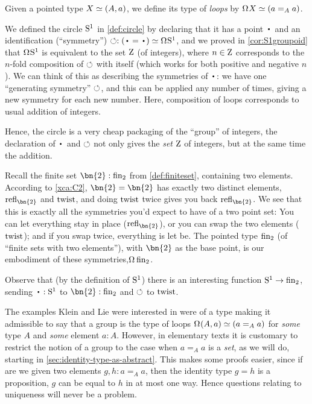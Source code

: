 \begin{definition}
  Given a pointed type $X\jdeq(A,a)$, we define its type of \emph{loops}
  by $\loops X \jdeq (a =_A a)$.
\end{definition}
\begin{example}\label{ex:base=base}
  We defined the circle ${\mathrm{S}^1}$ in \cref{def:circle} by declaring
  that it has a point $\base$ and an identification (``symmetry'')
  $\Sloop:(\base=\base) \jdeq \loops\Sc$,
  and we proved in \cref{cor:S1groupoid} that $\loops\Sc$ is equivalent
  to the set $\mathrm{Z}$ (of integers),
  where $n\in\mathrm{Z}$ corresponds to the $n$-fold composition of $\circlearrowleft$ with itself
  (which works for both positive and negative $n$).
  We can think of this as describing the symmetries of $\base$:
  we have one ``generating symmetry'' $\circlearrowleft$,
  and this can be applied any number of times,
  giving a new symmetry for each new number.
  Here, composition of loops corresponds to usual addition of integers.

Hence, the circle is a very cheap packaging of the ``{group}'' of integers, the declaration of $\base$ and $\circlearrowleft$ not only gives the \emph{set} $\mathrm{Z}$ of integers, but at the same time the addition.
\end{example}
\begin{example}
  Recall the finite set $\bn{2}:\fin_2$ from \cref{def:finiteset}, containing two elements.   
  According to \cref{xca:C2}, $\bn{2} =\bn{2} $ has exactly two distinct elements,
  $\refl{\bn{2}}$ and $\mathrm{twist}$,
  and doing $\mathrm{twist}$ twice gives you back $\refl{\bn{2}}$.
  We see that this is exactly all the symmetries
  you'd expect to have of a two point set:
  You can let everything stay in place ($\refl{\bn{2}}$),
  or you can swap the two elements ($\mathrm{twist}$);
  and if you swap twice, everything is let be.
  The pointed type $\fin_2$ (of ``finite sets with two elements''),
  with $\bn{2}$ as the base point,
  is our embodiment of these symmetries,\ie $\loops\fin_2$.

  Observe that (by the definition of ${\mathrm{S}^1}$)
  there is an interesting function $\Sc\to\fin_2$,
  sending $\base:\Sc$ to $\bn{2} :\fin_2$ and $\circlearrowleft$ to $\mathrm{twist}$.
\end{example}

The examples Klein and Lie were interested in were of a type making it admissible to
say that a group is the type of loops $\loops(A,a) \jdeq (a=_Aa)$
for \emph{some} type $A$ and \emph{some} element $a:A$.
However, in elementary texts it is customary to restrict the notion of a group to the case when $a=_Aa$ is a \emph{set}, as we will do, starting in \cref{sec:identity-type-as-abstract}.
This makes some proofs easier, since if are we given two elements $g,h:a=_Aa$, then the identity type $g=h$ is a proposition, \ie $g$ can be equal to $h$ in at most one way.  Hence questions relating to uniqueness will never be a problem.


